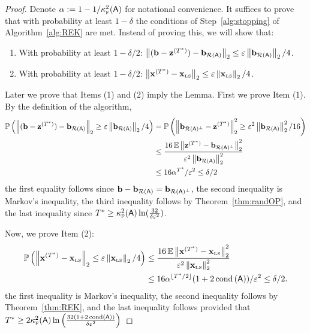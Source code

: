 \begin{proof}
	Denote $\alpha := 1 - 1/ \kappaFS(\matA)$ for notational convenience. It suffices to prove that with probability at least $1-\delta$ the conditions of Step~\ref{alg:stopping} of Algorithm~\ref{alg:REK} are met. Instead of proving this, we will show that:
\begin{enumerate}
	\item With probability at least $1-\delta/2$: $\norm{(\b - \z^{(T^*)}) - \br} \leq \eps\norm{\br} / 4$.
	\item With probability at least $1-\delta/2$: $\norm{\x^{(T^*)}-\xls} \leq \eps \norm{\xls}/4$.
\end{enumerate}
Later we prove that Items (1) and (2) imply the Lemma. First we prove Item (1). By the definition of the algorithm,
\begin{align*}
	\Prob{ \norm{ (\b - \z^{(T^*)}) - \br } \geq \eps\norm{\br} / 4} & =  \Prob{ \norm{\bc - \z^{(T^*)}  }^2 \geq \eps^2\norm{\br}^2/16} \\
																	& \leq  \frac{16 \EE \norm{  \z^{(T^*)} - \bc }^2}{\eps^2\norm{\br}^2} \\
																	& \leq  16\alpha^{T^*}/\eps^2  \leq \delta/2
\end{align*}
the first equality follows since $\b -\br = \bc$, the second inequality is Markov's inequality, the third inequality follows by Theorem~\ref{thm:randOP}, and the last inequality since $T^*\geq \kappaFS(\matA) \ln(\frac{32}{\delta \eps^2})$.

Now, we prove Item (2):
\begin{align*}
		\Prob{ \norm{\x^{(T^*)}-\xls} \leq \eps\norm{\xls}/4} & \leq  \frac{ 16\EE \norm{\x^{(T^*)}-\xls}^2 }{\eps^2\norm{\xls}^2} \\
																					& \leq  16\alpha^{\lfloor T^*/2\rfloor} (1+2\cond{\matA})/ \eps^2  \leq \delta/2.
\end{align*}
the first inequality is Markov's inequality, the second inequality follows by Theorem~\ref{thm:REK}, and the last inequality follows provided that $T^* \geq 2\kappaFS(\matA) \ln \left(\frac{32(1+2\cond{\matA})}{\delta\eps^2}\right)$
%


\end{proof}
